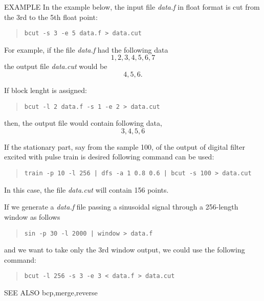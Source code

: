 \begin{qsection}{EXAMPLE}
In the example below, the input file {\em data.f} in float format
is cut from the 3rd to the 5th float point:
\begin{quote}
 \verb!bcut -s 3 -e 5 data.f > data.cut!
\end{quote}
For example, if the file {\em data.f} had the following data
\begin{displaymath}
  1, 2, 3, 4, 5, 6, 7
\end{displaymath}
the output file {\em data.cut} would be 
\begin{displaymath}
  4, 5, 6.
\end{displaymath}
\par
If block lenght is assigned:
\begin{quote}
 \verb!bcut -l 2 data.f -s 1 -e 2 > data.cut!
\end{quote}
then, the output file would contain following data,
\begin{displaymath}
  3, 4, 5, 6
\end{displaymath}
\par
If the stationary part, say from the sample 100,
of the output of digital filter excited with
pulse train is desired following command can be used:
\begin{quote}
  \verb!train -p 10 -l 256 | dfs -a 1 0.8 0.6 | bcut -s 100 > data.cut!
\end{quote}
In this case, the file {\em data.cut} will contain 156 points.
\par
If we generate a {\em data.f} file passing a sinusoidal signal
through a 256-length window as follows
\begin{quote}
  \verb!sin -p 30 -l 2000 | window > data.f!
\end{quote}
and we want to take only the 3rd window output,
we could use the following command:
\begin{quote}
  \verb!bcut -l 256 -s 3 -e 3 < data.f > data.cut!
\end{quote}
\end{qsection}

\begin{qsection}{SEE ALSO}
bcp,merge,reverse
\end{qsection}
